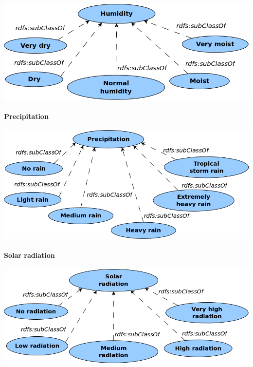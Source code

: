 \begin{center}
  \includegraphics[scale=.3]{figures/diagrams/humidity.png}
\end{center}

\paragraph{Precipitation}

\begin{center}
  \includegraphics[scale=.3]{figures/diagrams/precipitation.png}
\end{center}

\paragraph{Solar radiation}

\begin{center}
  \includegraphics[scale=.3]{figures/diagrams/solar-radiation.png}
\end{center}

